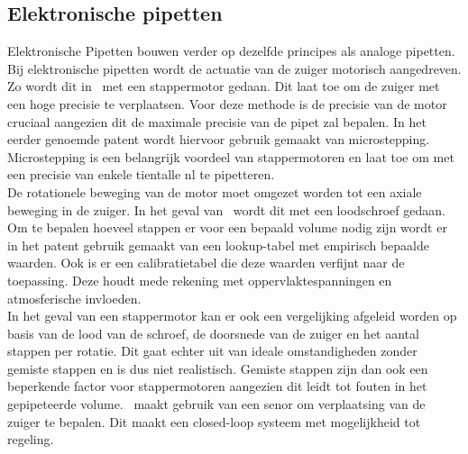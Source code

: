 \subsection{Elektronische pipetten}
Elektronische Pipetten bouwen verder op dezelfde principes als analoge pipetten. Bij elektronische pipetten wordt de actuatie van de zuiger motorisch aangedreven. Zo wordt dit in\ \cite{RN35} met een stappermotor gedaan. Dit laat toe om de zuiger met een hoge precisie te verplaatsen. Voor deze methode is de precisie van de motor cruciaal aangezien dit de maximale precisie van de pipet zal bepalen. In het eerder genoemde patent wordt hiervoor gebruik gemaakt van microstepping. Microstepping is een belangrijk voordeel van stappermotoren en laat toe om met een precisie van enkele tientalle nl te pipetteren. 
\\[12pt]De rotationele beweging van de motor moet omgezet worden tot een axiale beweging in de zuiger. In het geval van\ \cite{RN35} wordt dit met een loodschroef gedaan. Om te bepalen hoeveel stappen er voor een bepaald volume nodig zijn wordt er in het patent gebruik gemaakt van een lookup-tabel met empirisch bepaalde waarden. Ook is er een calibratietabel die deze waarden verfijnt naar de toepassing. Deze houdt mede rekening met oppervlaktespanningen en atmosferische invloeden. 
\\[12pt]In het geval van een stappermotor kan er ook een vergelijking afgeleid worden op basis van de lood van de schroef, de doorsnede van de zuiger en het aantal stappen per rotatie. Dit gaat echter uit van ideale omstandigheden zonder gemiste stappen en is dus niet realistisch. Gemiste stappen zijn dan ook een beperkende factor voor stappermotoren aangezien dit leidt tot fouten in het gepipeteerde volume.\ \cite{RN36} maakt gebruik van een senor om verplaatsing van de zuiger te bepalen. Dit maakt een closed-loop systeem met mogelijkheid tot regeling.